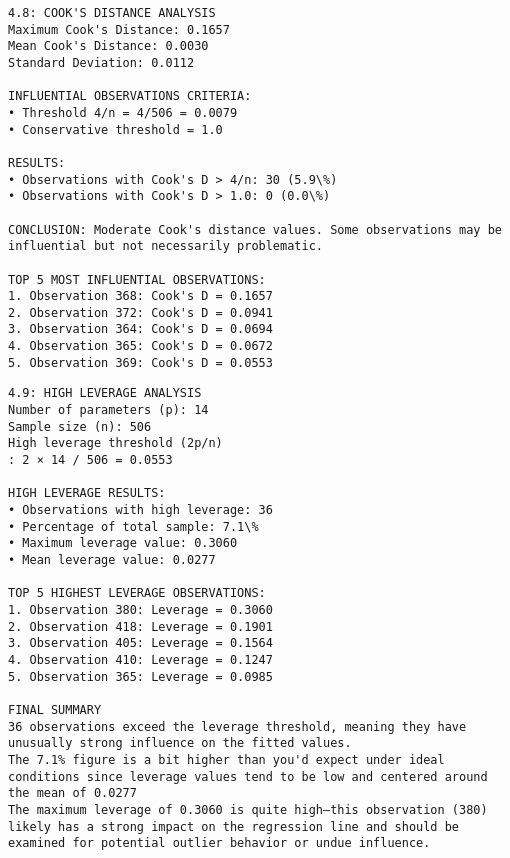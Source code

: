 \documentclass[8pt, twocolumn]{extarticle}
\begin{document}
    \begin{Verbatim}[commandchars=\\\{\}]
4.8: COOK'S DISTANCE ANALYSIS
Maximum Cook's Distance: 0.1657
Mean Cook's Distance: 0.0030
Standard Deviation: 0.0112

INFLUENTIAL OBSERVATIONS CRITERIA:
• Threshold 4/n = 4/506 = 0.0079
• Conservative threshold = 1.0

RESULTS:
• Observations with Cook's D > 4/n: 30 (5.9\%)
• Observations with Cook's D > 1.0: 0 (0.0\%)

CONCLUSION: Moderate Cook's distance values. Some observations may be
influential but not necessarily problematic.

TOP 5 MOST INFLUENTIAL OBSERVATIONS:
1. Observation 368: Cook's D = 0.1657
2. Observation 372: Cook's D = 0.0941
3. Observation 364: Cook's D = 0.0694
4. Observation 365: Cook's D = 0.0672
5. Observation 369: Cook's D = 0.0553

    \end{Verbatim}

    \begin{Verbatim}[commandchars=\\\{\}]
4.9: HIGH LEVERAGE ANALYSIS
Number of parameters (p): 14
Sample size (n): 506
High leverage threshold (2p/n)
: 2 × 14 / 506 = 0.0553

HIGH LEVERAGE RESULTS:
• Observations with high leverage: 36
• Percentage of total sample: 7.1\%
• Maximum leverage value: 0.3060
• Mean leverage value: 0.0277

TOP 5 HIGHEST LEVERAGE OBSERVATIONS:
1. Observation 380: Leverage = 0.3060
2. Observation 418: Leverage = 0.1901
3. Observation 405: Leverage = 0.1564
4. Observation 410: Leverage = 0.1247
5. Observation 365: Leverage = 0.0985

FINAL SUMMARY
36 observations exceed the leverage threshold, meaning they have unusually strong influence on the fitted values.
The 7.1% figure is a bit higher than you'd expect under ideal conditions since leverage values tend to be low and centered around the mean of 0.0277
The maximum leverage of 0.3060 is quite high—this observation (380) likely has a strong impact on the regression line and should be examined for potential outlier behavior or undue influence.
    \end{Verbatim}
\end{document}
